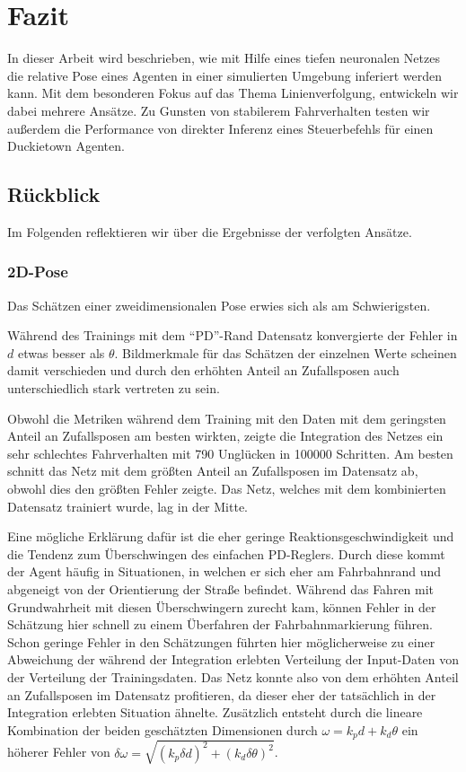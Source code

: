 \chapter{Fazit}

In dieser Arbeit wird beschrieben, wie mit Hilfe eines tiefen neuronalen Netzes die relative Pose eines Agenten in einer simulierten Umgebung inferiert werden kann. Mit dem besonderen Fokus auf das Thema Linienverfolgung, entwickeln wir dabei mehrere Ansätze. Zu Gunsten von stabilerem Fahrverhalten testen wir außerdem die Performance von direkter Inferenz eines Steuerbefehls für einen Duckietown Agenten.

\section{Rückblick}

Im Folgenden reflektieren wir über die Ergebnisse der verfolgten Ansätze.

\subsection{2D-Pose}

Das Schätzen einer zweidimensionalen Pose erwies sich als am Schwierigsten.

Während des Trainings mit dem ``PD''-Rand Datensatz konvergierte der Fehler in $d$ etwas besser als $\theta$. Bildmerkmale für das Schätzen der einzelnen Werte scheinen damit verschieden und durch den erhöhten Anteil an Zufallsposen auch unterschiedlich stark vertreten zu sein.

Obwohl die Metriken während dem Training mit den Daten mit dem geringsten Anteil an Zufallsposen am besten wirkten, zeigte die Integration des Netzes ein sehr schlechtes Fahrverhalten mit 790 Unglücken in 100000 Schritten. Am besten schnitt das Netz mit dem größten Anteil an Zufallsposen im Datensatz ab, obwohl dies den größten Fehler zeigte. Das Netz, welches mit dem kombinierten Datensatz trainiert wurde, lag in der Mitte.
	
Eine mögliche Erklärung dafür ist die eher geringe Reaktionsgeschwindigkeit und die Tendenz zum Überschwingen des einfachen PD-Reglers. Durch diese kommt der Agent häufig in Situationen, in welchen er sich eher am Fahrbahnrand und abgeneigt von der Orientierung der Straße befindet. Während das Fahren mit Grundwahrheit mit diesen Überschwingern zurecht kam, können Fehler in der Schätzung hier schnell zu einem Überfahren der Fahrbahnmarkierung führen. Schon geringe Fehler in den Schätzungen führten hier möglicherweise zu einer Abweichung der während der Integration erlebten Verteilung der Input-Daten von der Verteilung der Trainingsdaten. Das Netz konnte also von dem erhöhten Anteil an Zufallsposen im Datensatz profitieren, da dieser eher der tatsächlich in der Integration erlebten Situation ähnelte. Zusätzlich entsteht durch die lineare Kombination der beiden geschätzten Dimensionen durch $\omega = k_p d + k_d \theta$ ein höherer Fehler von $\delta\omega = \sqrt{(k_p\delta d)^2 + (k_d\delta \theta)^2}$.

